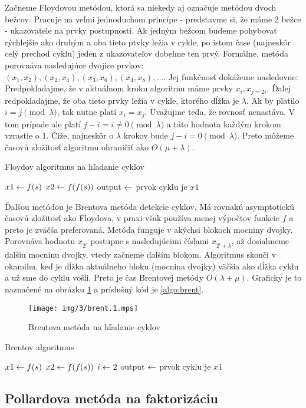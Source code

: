 Začneme Floydovou metódou, ktorá sa niekedy aj označuje metódou dvoch
bežcov. Pracuje na veľmi jednoduchom princípe - predstavme si, že máme
2 bežce - ukazovatele na prvky postupnosti. Ak jedným bežcom budeme
pohybovať rýchlejšie ako druhým a oba tieto ptvky ležia v cykle, po
istom čase (najneskôr celý prechod cyklu) jeden z ukazovateľov dobehne
ten prvý. Formálne, metóda porovnáva nasledujúce dvojice prvkov:
$(x_1,x_2), (x_2,x_4), (x_3,x_6), (x_4,x_8), \dots$.
Jej funkčnosť dokážeme nasledovne: Predpokladajme, že v aktuálnom
kroku algoritmu máme prvky $x_i, x_{j=2i}$. Ďalej redpokladajme,
že oba tieto prvky ležia v cykle, ktorého dĺžka je $\lambda$.
Ak by platilo $i = j \pmod{\lambda}$, tak nutne platí $x_i = x_j$.
Uvažujme teda, že rovnosť nenastáva. V tom prípade ale platí $j-i = i \ne
0 \pmod{\lambda}$ a táto hodnota každým krokom vzrastie o 1. Čiže,
najneskôr o $\lambda$ krokov bude $j-i = 0 \pmod{\lambda}$.
Preto môžeme časovú zložitosť algoritmu ohraničiť ako $O(\mu+\lambda)$.

\begin{algorithm}
    \label{algo:floyd}
    \caption{Floydov algoritmus na hľadanie cyklov}
    $x1 \leftarrow f(s)$\;
    $x2 \leftarrow f(f(s))$\;
    output $\leftarrow$ prvok cyklu je $x1$\;
\end{algorithm}

Ďalšou metódou je Brentova metóda detekcie cyklov. Má rovnakú
asymptotickú časovú zložitosť ako Floydova, v praxi však používa menej
výpočtov funkcie $f$ a preto je zväčša preferovaná.
Metóda funguje v akýchsi blokoch mocniny dvojky.
Porovnáva hodnotu $x_{2^i}$ postupne s nasledujúcimi číslami
$x_{2^i+k}$, až dosiahneme ďalšiu mocninu dvojky, vtedy začneme ďalším
blokom. Algoritmus skončí v okamihu, keď je dĺžka aktuálneho bloku
(mocnina dvojky) väčšia ako dĺžka cyklu a už sme do cyklu vošli.
Preto je čas Brentovej metódy $O(\lambda + \mu)$.
Graficky je to naznačené na obrázku \ref{fig:brent} a príslušný kód je
\ref{algo:brent}.

\begin{figure}[h!]
    \label{fig:brent}
    \caption{Brentova metóda na hľadanie cyklov}
    \centering
    \texttt{[image: img/3/brent.1.mps]}
\end{figure}

\begin{algorithm}
    \label{algo:floyd}
    \caption{Brentov algoritmus}
    $x1 \leftarrow f(s)$\;
    $x2 \leftarrow f(f(s))$\;
    $i \leftarrow 2$\;
    output $\leftarrow$ prvok cyklu je $x1$\;
\end{algorithm}

\subsection{Pollardova metóda na faktorizáciu}
